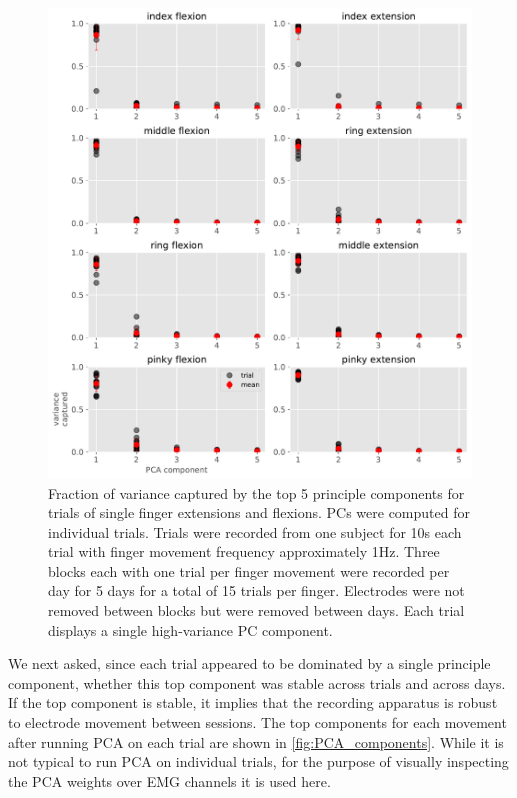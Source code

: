 \documentclass[
  a4paper,
]{article}
\begin{document}
\begin{figure}
\hypertarget{fig:PCA_variances}{%
\centering
\includegraphics[width=1\textwidth,height=\textheight]{images/data_analysis/fingers/PCA_variances.pdf}
\caption{Fraction of variance captured by the top 5 principle components
for trials of single finger extensions and flexions. PCs were computed
for individual trials. Trials were recorded from one subject for 10s
each trial with finger movement frequency approximately 1Hz. Three
blocks each with one trial per finger movement were recorded per day for
5 days for a total of 15 trials per finger. Electrodes were not removed
between blocks but were removed between days. Each trial displays a
single high-variance PC component.}\label{fig:PCA_variances}
}
\end{figure}

We next asked, since each trial appeared to be dominated by a single
principle component, whether this top component was stable across trials
and across days. If the top component is stable, it implies that the
recording apparatus is robust to electrode movement between sessions.
The top components for each movement after running PCA on each trial are
shown in \cref{fig:PCA_components}. While it is not typical to run PCA
on individual trials, for the purpose of visually inspecting the PCA
weights over EMG channels it is used here.
\end{document}
